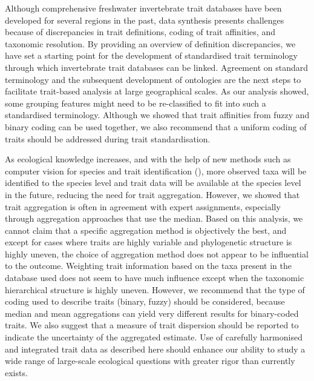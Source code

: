 \documentclass[12pt]{article}
\begin{document}
Although comprehensive freshwater invertebrate trait databases have been developed for several regions in the past, data synthesis presents challenges because of discrepancies in trait definitions, coding of trait affinities, and taxonomic resolution. By providing an overview of definition discrepancies, we have set a starting point for the development of standardised trait terminology through which invertebrate trait databases can be linked. Agreement on standard terminology and the subsequent development of ontologies are the next steps to facilitate trait-based analysis at large geographical scales. As our analysis showed, some grouping features might need to be re-classified to fit into such a standardised terminology. Although we showed that trait affinities from fuzzy and binary coding can be used together, we also recommend that a uniform coding of traits should be addressed during trait standardisation. 

As ecological knowledge increases, and with the help of new methods such as computer vision for species and trait identification (\cite{hoye_deep_2020}), more observed taxa will be identified to the species level and trait data will be available at the species level in the future, reducing the need for trait aggregation. However, we showed that trait aggregation is often in agreement with expert assignments, especially through aggregation approaches that use the median. Based on this analysis, we cannot claim that a specific aggregation method is objectively the best, and except for cases where traits are highly variable and phylogenetic structure is highly uneven, the choice of aggregation method does not appear to be influential to the outcome. Weighting trait information based on the taxa present in the database used does not seem to have much influence except when the taxonomic hierarchical structure is highly uneven. However, we recommend that the type of coding used to describe traits (binary, fuzzy) should be considered, because median and mean aggregations can yield very different results for binary-coded traits. We also suggest that a measure of trait dispersion should be reported to indicate the uncertainty of the aggregated estimate. Use of carefully harmonised and integrated trait data as described here should  enhance our ability to study a wide range of large-scale ecological questions with greater rigor than currently exists.
 
\end{document}
